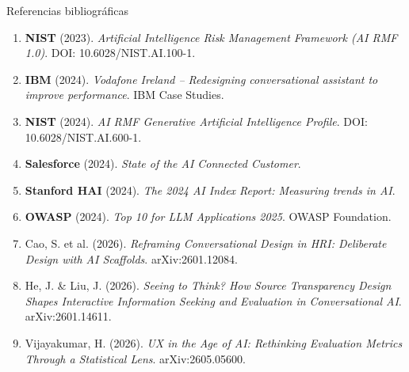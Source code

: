 \documentclass[10pt,aspectratio=169]{beamer}
\begin{document}
\appendix
\begin{frame}{Referencias bibliográficas}
    \begin{enumerate}\setlength{\itemsep}{0pt}
        \item \footnotesize \textbf{NIST} (2023). \textit{Artificial Intelligence Risk Management Framework (AI RMF 1.0)}. DOI: 10.6028/NIST.AI.100-1.
        \item \textbf{IBM} (2024). \textit{Vodafone Ireland -- Redesigning conversational assistant to improve performance}. IBM Case Studies.
        \item \textbf{NIST} (2024). \textit{AI RMF Generative Artificial Intelligence Profile}. DOI: 10.6028/NIST.AI.600-1.
        \item \textbf{Salesforce} (2024). \textit{State of the AI Connected Customer}.
        \item \textbf{Stanford HAI} (2024). \textit{The 2024 AI Index Report: Measuring trends in AI}.
        \item \textbf{OWASP} (2024). \textit{Top 10 for LLM Applications 2025}. OWASP Foundation.
        \item \footnotesize Cao, S. et al. (2026). \textit{Reframing Conversational Design in HRI: Deliberate Design with AI Scaffolds}. arXiv:2601.12084.
        \item \footnotesize He, J. \& Liu, J. (2026). \textit{Seeing to Think? How Source Transparency Design Shapes Interactive Information Seeking and Evaluation in Conversational AI}. arXiv:2601.14611.
        \item \footnotesize Vijayakumar, H. (2026). \textit{UX in the Age of AI: Rethinking Evaluation Metrics Through a Statistical Lens}. arXiv:2605.05600.
    \end{enumerate}
\end{frame}
\end{document}
